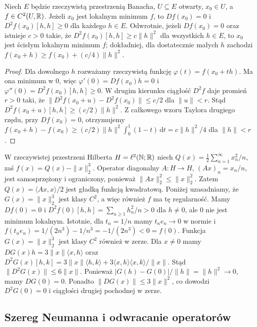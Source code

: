 \begin{stwierdzenie}
\label{prop:extremum15}
Niech $E$ będzie rzeczywistą przestrzenią Banacha, $U\subseteq E$ otwarty, $x_0\in U$, a $f\in C^2(U,\mathbb R)$. Jeżeli $x_0$ jest lokalnym minimum $f$, to $Df(x_0)=0$ i $D^2f(x_0)[h,h]\ge0$ dla każdego $h\in E$. Odwrotnie, jeżeli $Df(x_0)=0$ oraz istnieje $c>0$ takie, że $D^2f(x_0)[h,h]\ge c\|h\|^2$ dla wszystkich $h\in E$, to $x_0$ jest ścisłym lokalnym minimum $f$; dokładniej, dla dostatecznie małych $h$ zachodzi $f(x_0+h)\ge f(x_0)+(c/4)\|h\|^2$.
\end{stwierdzenie}
\begin{proof}
Dla dowolnego $h$ rozważamy rzeczywistą funkcję $\varphi(t)=f(x_0+th)$. Ma ona minimum w $0$, więc $\varphi'(0)=Df(x_0)h=0$ i $\varphi''(0)=D^2f(x_0)[h,h]\ge0$. W drugim kierunku ciągłość $D^2f$ daje promień $r>0$ taki, że $\|D^2f(x_0+u)-D^2f(x_0)\|\le c/2$ dla $\|u\|<r$. Stąd $D^2f(x_0+u)[h,h]\ge(c/2)\|h\|^2$. Z całkowego wzoru Taylora drugiego rzędu, przy $Df(x_0)=0$, otrzymujemy $f(x_0+h)-f(x_0)\ge(c/2)\|h\|^2\int_0^1(1-t)\,\mathrm dt=c\|h\|^2/4$ dla $\|h\|<r$.
\end{proof}

\begin{przyklad}
\label{ex:positive-hessian15}
W rzeczywistej przestrzeni Hilberta $H=\ell^2(\mathbb N;\mathbb R)$ niech
$Q(x)=\frac12\sum_{n=1}^\infty x_n^2/n$, zaś $f(x)=Q(x)-\|x\|_2^3$. Operator diagonalny $A:H\to H$, $(Ax)_n=x_n/n$, jest samosprzężony i ograniczony, ponieważ $\|Ax\|_2^2\le\|x\|_2^2$. Zatem $Q(x)=\langle Ax,x\rangle/2$ jest gładką funkcją kwadratową. Poniżej uzasadniamy, że $G(x)=\|x\|_2^3$ jest klasy $C^2$, a więc również $f$ ma tę regularność. Mamy $Df(0)=0$ i $D^2f(0)[h,h]=\sum_{n\ge1}h_n^2/n>0$ dla $h\ne0$, ale $0$ nie jest minimum lokalnym. Istotnie, dla $t_n=1/n$ mamy $t_ne_n\to0$ w normie i $f(t_ne_n)=1/(2n^3)-1/n^3=-1/(2n^3)<0=f(0)$. Funkcja $G(x)=\|x\|_2^3$ jest klasy $C^2$ również w zerze. Dla $x\ne0$ mamy
$DG(x)h=3\|x\|\langle x,h\rangle$ oraz
$D^2G(x)[h,k]=3\|x\|\langle h,k\rangle+3\langle x,h\rangle\langle x,k\rangle/\|x\|$.
Stąd $\|D^2G(x)\|\le6\|x\|$. Ponieważ $|G(h)-G(0)|/\|h\|=\|h\|^2\to0$, mamy $DG(0)=0$. Ponadto $\|DG(x)\|\le3\|x\|^2$, co dowodzi $D^2G(0)=0$ i ciągłości drugiej pochodnej w zerze.
\end{przyklad}

\subsection{Szereg Neumanna i odwracanie operatorów}

